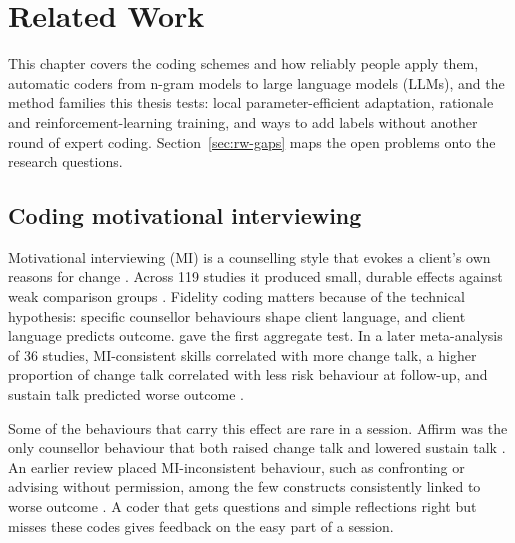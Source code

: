 
\chapter{Related Work}
\label{ch:related}

This chapter covers the coding schemes and how reliably people apply them, automatic coders from n-gram models to large language models (LLMs), and the method families this thesis tests: local parameter-efficient adaptation, rationale and reinforcement-learning training, and ways to add labels without another round of expert coding. Section~\ref{sec:rw-gaps} maps the open problems onto the research questions.

\section{Coding motivational interviewing}
\label{sec:rw-coding}

Motivational interviewing (MI) is a counselling style that evokes a client's own reasons for change \citep{miller2023mi}. Across 119 studies it produced small, durable effects against weak comparison groups \citep{lundahl2010meta}. Fidelity coding matters because of the technical hypothesis: specific counsellor behaviours shape client language, and client language predicts outcome. \citet{magill2014technical} gave the first aggregate test. In a later meta-analysis of 36 studies, MI-consistent skills correlated with more change talk, a higher proportion of change talk correlated with less risk behaviour at follow-up, and sustain talk predicted worse outcome \citep{magill2018process}.

Some of the behaviours that carry this effect are rare in a session. Affirm was the only counsellor behaviour that both raised change talk and lowered sustain talk \citep{apodaca2016which}. An earlier review placed MI-inconsistent behaviour, such as confronting or advising without permission, among the few constructs consistently linked to worse outcome \citep{apodaca2009mechanisms}. A coder that gets questions and simple reflections right but misses these codes gives feedback on the easy part of a session.


